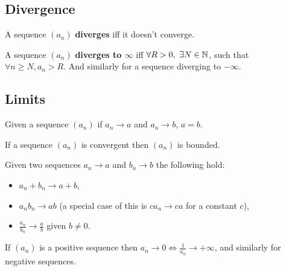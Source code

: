 \documentclass[../Year1.tex]{subfiles}
\begin{document}
\subsection{Divergence}

\begin{definition}[Divergence]
    A sequence $(a_n)$ \textbf{diverges} iff it doesn't converge.
\end{definition}

\begin{definition}
    A sequence $(a_n)$ \textbf{diverges to $\infty$} iff $\forall R>0, \ \exists N\in\mathbb{N}$, such that $\forall n\geq N, a_n>R$. And similarly for a sequence diverging to $-\infty$.
\end{definition}

\subsection{Limits}

\begin{theorem}
    Given a sequence $(a_n)$ if $a_n\rightarrow a$ and $a_n\rightarrow b$, $a=b$.
\end{theorem}

\begin{theorem}
    If a sequence $(a_n)$ is convergent then $(a_n)$ is bounded.
\end{theorem}

\begin{theorem}
    Given two sequences $a_n\rightarrow a$ and $b_n\rightarrow b$ the following hold: \begin{itemize}
        \item $a_n + b_n \rightarrow a + b$,
        \item $a_nb_n \rightarrow ab$ (a special case of this is $ca_n\rightarrow ca$ for a constant $c$),
        \item $\displaystyle{\frac{a_n}{b_n} \rightarrow \frac{a}{b}}$ given $b\neq0$.
    \end{itemize}
\end{theorem}

\vspace{-15pt}

\begin{theorem}
    If $(a_n)$ is a positive sequence then $a_n\rightarrow0\iff\displaystyle{\frac{1}{a_n}\rightarrow+\infty}$, and similarly for negative sequences.
\end{theorem}
\end{document}
